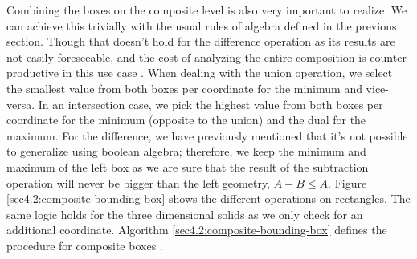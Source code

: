 \documentclass[a4paper,11pt,oneside]{article}
\begin{document}
Combining the boxes on the composite level is also very important to realize. We can achieve this trivially with the usual rules of algebra defined in the previous section. Though that doesn't hold for the difference operation as its results are not easily foreseeable, and the cost of analyzing the entire composition is counter-productive in this use case \cite{ROTH1982109}. When dealing with the union operation, we select the smallest value from both boxes per coordinate for the minimum and vice-versa. In an intersection case, we pick the highest value from both boxes per coordinate for the minimum (opposite to the union) and the dual for the maximum.  For the difference, we have previously mentioned that it's not possible to generalize using boolean algebra; therefore, we keep the minimum and maximum of the left box as we are sure that the result of the subtraction operation will never be bigger than the left geometry, $A - B \leq A$. Figure \ref{sec4.2:composite-bounding-box} shows the different operations on rectangles. The same logic holds for the three dimensional solids as we only check for an additional coordinate. Algorithm \ref{sec4.2:composite-bounding-box} defines the procedure for composite boxes \cite{sbounds_csg}.
\end{document}
